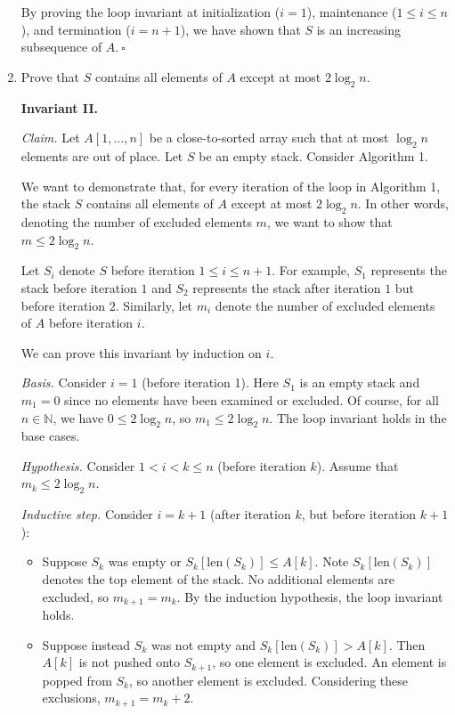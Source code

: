 \begin{enumerate}
\begin{solution}
By proving the loop invariant at initialization ($i=1$), maintenance ($1\leq i\leq n$), and termination ($i=n+1$), we have shown that $S$ is an increasing subsequence of $A$.$~\square$
\end{solution}
\newpage
\item Prove that $S$ contains all elements of $A$ except at most $2\log_2 n$.
\begin{solution}\textbf{Invariant II.}

\textit{Claim. }Let $A[1,\dots,n]$ be a close-to-sorted array such that at most $\log_2n$ elements are out of place. Let $S$ be an empty stack. Consider Algorithm 1.

We want to demonstrate that, for every iteration of the loop in Algorithm 1, the stack $S$ contains all elements of $A$ except at most $2\log_2n$. In other words, denoting the number of excluded elements $m$, we want to show that $m\leq 2\log_2n$.

Let $S_i$ denote $S$ before iteration $1\leq i\leq n+1$. For example, $S_1$ represents the stack before iteration $1$ and $S_2$ represents the stack after iteration $1$ but before iteration $2$. Similarly, let $m_i$ denote the number of excluded elements of $A$ before iteration $i$.

We can prove this invariant by induction on $i$.

\textit{Basis. }Consider $i=1$ (before iteration 1). Here $S_1$ is an empty stack and $m_1=0$ since no elements have been examined or excluded. Of course, for all $n\in\mathbb{N}$, we have $0\leq 2\log_2n$, so $m_1\leq 2\log_2n$. The loop invariant holds in the base cases.

\textit{Hypothesis. }Consider $1<i<k\leq n$ (before iteration $k$). Assume that $m_k\leq 2\log_2 n$.

\textit{Inductive step. }Consider $i=k+1$ (after iteration $k$, but before iteration $k+1$):
\begin{itemize}
\item Suppose $S_k$ was empty or $S_k[\text{len}(S_k)]\leq A[k]$. Note $S_k[\text{len}(S_k)]$ denotes the top element of the stack. No additional elements are excluded, so $m_{k+1}=m_k$. By the induction hypothesis, the loop invariant holds.
\item Suppose instead $S_k$ was not empty and $S_k[\text{len}(S_k)]>A[k]$. Then $A[k]$ is not pushed onto $S_{k+1}$, so one element is excluded. An element is popped from $S_k$, so another element is excluded. Considering these exclusions, $m_{k+1}=m_k+2$.


\end{itemize}
\end{solution}
\end{enumerate}
